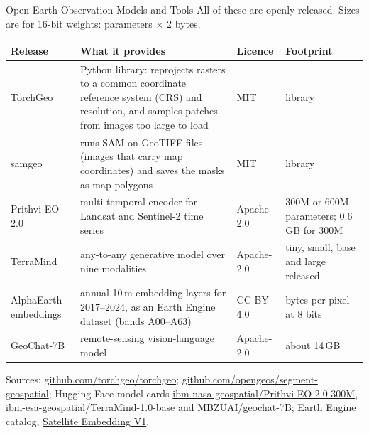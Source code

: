 \begin{frame}{Open Earth-Observation Models and Tools}
  All of these are openly released. Sizes are for 16-bit weights: parameters $\times$ 2 bytes.\par
  \vspace{0.6em}
  {\centering\scriptsize
  \begin{tabular}{>{\raggedright\arraybackslash}p{2.5cm} >{\raggedright\arraybackslash}p{5.5cm} >{\raggedright\arraybackslash}p{1.7cm} >{\raggedright\arraybackslash}p{2.6cm}}
    \toprule
    \textbf{Release} & \textbf{What it provides} & \textbf{Licence} & \textbf{Footprint} \\
    \midrule
    TorchGeo & Python library: reprojects rasters to a common coordinate reference system (CRS) and resolution, and samples patches from images too large to load & MIT & library \\
    \addlinespace[0.25em]
    samgeo & runs SAM on GeoTIFF files (images that carry map coordinates) and saves the masks as map polygons & MIT & library \\
    \addlinespace[0.25em]
    Prithvi-EO-2.0 & multi-temporal encoder for Landsat and Sentinel-2 time series & Apache-2.0 & 300M or 600M parameters; 0.6\,GB for 300M \\
    \addlinespace[0.25em]
    TerraMind & any-to-any generative model over nine modalities & Apache-2.0 & tiny, small, base and large released \\
    \addlinespace[0.25em]
    AlphaEarth embeddings & annual 10\,m embedding layers for 2017--2024, as an Earth Engine dataset (bands A00--A63) & CC-BY 4.0 & 64 bytes per pixel at 8 bits \\
    \addlinespace[0.25em]
    GeoChat-7B & remote-sensing vision-language model & Apache-2.0 & about 14\,GB \\
    \bottomrule
  \end{tabular}\par}
  \vspace{0.6em}
  {\scriptsize Sources: \href{https://github.com/torchgeo/torchgeo}{github.com/torchgeo/torchgeo}; \href{https://github.com/opengeos/segment-geospatial}{github.com/opengeos/segment-geospatial}; Hugging Face model cards \href{https://huggingface.co/ibm-nasa-geospatial/Prithvi-EO-2.0-300M}{ibm-nasa-geospatial/Prithvi-EO-2.0-300M}, \href{https://huggingface.co/ibm-esa-geospatial/TerraMind-1.0-base}{ibm-esa-geospatial/TerraMind-1.0-base} and \href{https://huggingface.co/MBZUAI/geochat-7B}{MBZUAI/geochat-7B}; Earth Engine catalog, \href{https://developers.google.com/earth-engine/datasets/catalog/GOOGLE_SATELLITE_EMBEDDING_V1_ANNUAL}{Satellite Embedding V1}.\par}
\end{frame}

